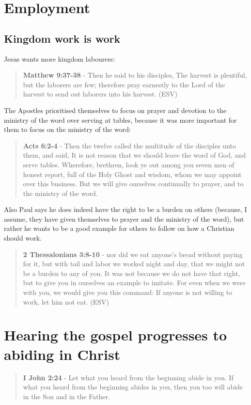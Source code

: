 \documentclass[11pt]{article}
\begin{document}
\section{Employment}
\label{sec:org61b5709}
\subsection{Kingdom work \textbf{is} work}
\label{sec:orgb50bbdb}
Jesus wants more kingdom labourers:

\begin{quote}
\textbf{Matthew 9:37-38} - Then he said to his disciples, The harvest is plentiful, but the laborers are few; therefore pray earnestly to the Lord of the harvest to send out laborers into his harvest. (ESV)
\end{quote}

The Apostles prioritised themselves to focus on prayer and devotion to the ministry of the word over serving at tables, because it was more important for them to focus on the ministry of the word:

\begin{quote}
\textbf{Acts 6:2-4} - Then the twelve called the multitude of the disciples unto them, and said, It is not reason that we should leave the word of God, and serve tables. Wherefore, brethren, look ye out among you seven men of honest report, full of the Holy Ghost and wisdom, whom we may appoint over this business. But we will give ourselves continually to prayer, and to the ministry of the word.
\end{quote}

Also Paul says he does indeed have the right to be a burden on others (because, I assume, they have given themselves to prayer and the ministry of the word), but rather he wants to be a good example for others to follow on how a Christian should work.

\begin{quote}
\textbf{2 Thessalonians 3:8-10} - nor did we eat anyone's bread without paying for it, but with toil and labor we worked night and day, that we might not be a burden to any of you. It was not because we do not have that right, but to give you in ourselves an example to imitate. For even when we were with you, we would give you this command: If anyone is not willing to work, let him not eat. (ESV)
\end{quote}

\section{Hearing the gospel progresses to abiding in Christ}
\label{sec:org17fd5d6}
\begin{quote}
\textbf{I John 2:24} - Let what you heard from the beginning abide in you. If what you heard from the beginning abides in you, then you too will abide in the Son and in the Father.
\end{quote}
\end{document}
